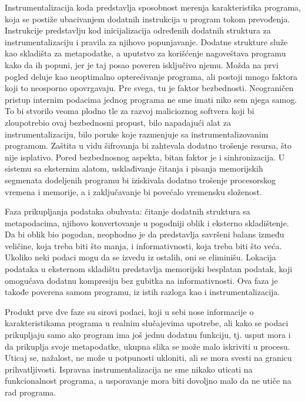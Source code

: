 \documentclass[12pt,oneside]{memoir}
\begin{document}
Instrumentalizacija\cite{SCI} koda predstavlja sposobnost merenja karakteristika programa, koja se postiže ubacivanjem dodatnih instrukcija u program tokom prevođenja. Instrukcije predstavlju kod inicijalizacija određenih dodatnih struktura za instrumentalizaciju i pravila za njihovo popunjavanje. Dodatne strukture služe kao skladišta za metapodatke, a uputstvo za korišćenje nagoveštava programu kako da ih popuni, jer je taj posao poveren isključivo njemu. Možda na prvi pogled deluje kao neoptimalno opterećivanje programa, ali postoji mnogo faktora koji to neosporno opovrgavaju. Pre svega, tu je faktor bezbednosti. Neograničen pristup internim podacima jednog programa ne sme imati niko sem njega samog. To bi stvorilo veoma  plodno tle za razvoj malicioznog softvera koji bi zloupotrebio ovaj bezbednosni propust, bilo napadajući alat za instrumentalizaciju, bilo poruke koje razmenjuje sa instrumentalizovanim programom. Zaštita u vidu šifrovanja bi zahtevala dodatno trošenje resursa, što nije isplativo. Pored bezbednosnog aspekta, bitan faktor je i sinhronizacija. U sistemu sa eksternim alatom, usklađivanje čitanja i pisanja memorijskih segmenata dodeljenih programu bi iziskivala dodatno trošenje procesorskog vremena i memorije, a i zaključavanje bi povećalo vremensku složenost. 


Faza prikupljanja podataka obuhvata: čitanje dodatnih struktura sa metapodacima, njihovo konvertovanje u pogodniji oblik i eksterno skladištenje. Da bi oblik bio pogodan, neophodno je da predstavlja savršeni balans između veličine, koja treba biti što manja, i informativnosti, koja treba biti što veća. Ukoliko neki podaci mogu da se izvedu iz ostalih, oni se eliminišu. Lokacija podataka u eksternom skladištu predstavlja memorijski besplatan podatak, koji omogućava dodatnu kompresiju bez gubitka na informativnosti. Ova faza je takođe poverena samom programu, iz istih razloga kao i instrumentalizacija. 


Produkt prve dve faze su sirovi podaci, koji u sebi nose informacije o karakteristikama programa u realnim slučajevima upotrebe, ali kako se podaci prikupljaju samo ako program ima još jednu dodatnu funkciju, tj. usput mora i da prikuplja svoje metapodatke, ukupna slika se može malo iskriviti u procesu. Uticaj se, nažalost, ne može u potpunosti ukloniti, ali se mora svesti na granicu prihvatljivosti. Ispravna instrumentalizacija ne sme nikako uticati na funkcionalnost programa, a usporavanje mora biti dovoljno malo da ne utiče na rad programa. 
\end{document}
